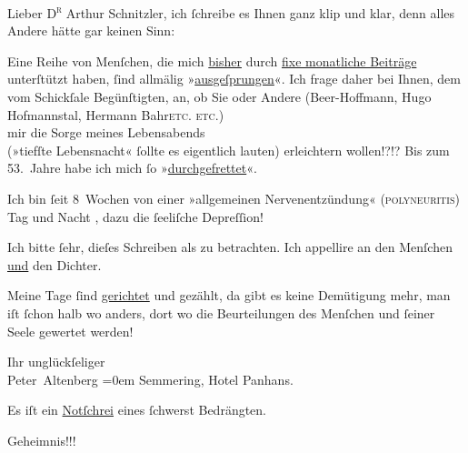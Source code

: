 \pstart{}Lieber \textsc{D\textsuperscript{r}} Arthur Schnitzler,\pend\vspace{0.5em}
\pstart
           ich ſchreibe es Ihnen ganz klip und klar, denn alles Andere hätte gar keinen
               Sinn:\pend
           
\pstart
           Eine Reihe von Menſchen, die mich \uline{bisher} durch \uline{fixe monatliche Beiträge} unterſtützt haben, ſind
               allmälig »\uline{ausgeſprungen}«. Ich frage daher bei Ihnen,
               dem vom Schickſale Begünſtigten, an, ob Sie oder Andere (Beer-Hoffmann, Hugo
                  Hofmannstal, Hermann Bahr\textsc{etc. etc.}) {\\}mir die Sorge meines
               Lebensabends{\\}(»tiefſte Lebensnacht« ſollte es eigentlich lauten) erleichtern
               wollen!?!? \introOben{}Bis zum 53. Jahre habe ich mich ſo »\uline{durchgefrettet}«.\introOben{}\pend
           
\pstart
           {\pb}Ich bin ſeit 8 Wochen von einer
               »allgemeinen Nervenentzündung« (\textsc{polyneuritis}) Tag und Nacht
                  , dazu die ſeeliſche Depreſſion!\pend
           
\pstart
           Ich bitte ſehr, dieſes Schreiben als  zu
               betrachten. \introOben{}Ich appellire an den Menſchen \uline{und} den Dichter.\introOben{}\pend
           
\pstart
           Meine Tage ſind \uline{gerichtet} und gezählt, da gibt es
               keine Demütigung mehr, man iſt ſchon halb wo anders, dort wo die Beurteilungen des
               Menſchen und ſeiner Seele  gewertet werden!\pend
           
\pstart
           Ihr unglückſeliger{\\[\baselineskip]}\spacefill\mbox{Peter Altenberg}\pend
           \leftskip=0em{}
\pstart
           \noindent{}Semmering, Hotel Panhans.\pend
           
\pstart
           Es iſt ein \uline{Notſchrei} eines ſchwerst
                  Bedrängten.\pend
           
\pstart
           \raggedleft{}Geheimnis!!!\pend
           \endnumbering{}  
      